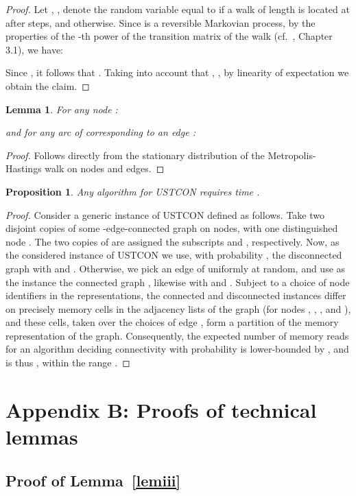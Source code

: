 \documentclass[11pt,a4paper]{article}
\newtheorem{proposition}{Proposition}
\newtheorem{lemma}{Lemma}
\renewcommand{\*}{\hspace*{5mm}}
\begin{document}
\begin{proof}
Let , , denote the random variable equal to  if a walk of length  is located at  after  steps, and  otherwise. Since  is a reversible Markovian process, by the properties of the -th power of the transition matrix of the walk (cf.~\cite{AF}, Chapter 3.1), we have:

Since , it follows that . Taking into account that , , by linearity of expectation we obtain the claim.
\end{proof}


\begin{lemma}\label{lembla}
For any node :

and for any arc  of  corresponding to an edge :

\end{lemma}
\begin{proof}
Follows directly from the stationary distribution of the Metropolis-Hastings walk on nodes and edges.
\end{proof}

\begin{proposition}\label{lbm}
Any algorithm for USTCON requires time .
\end{proposition}
\begin{proof}
Consider a generic instance of USTCON defined as follows. Take two disjoint copies of some -edge-connected graph  on  nodes, with one distinguished node . The two copies of  are assigned the subscripts  and , respectively. Now, as the considered instance of USTCON we use, with probability , the disconnected graph  with  and . Otherwise, we pick an edge  of  uniformly at random, and use as the instance the connected graph , likewise with  and . Subject to a choice of node identifiers in the representations, the connected and disconnected instances differ on precisely  memory cells in the adjacency lists of the graph (for nodes , , , and ), and these cells, taken over the choices of edge , form a partition of the memory representation of the graph. Consequently, the expected number of memory reads for an algorithm deciding connectivity with probability  is lower-bounded by , and is thus , within the range .
\end{proof}


\section*{Appendix B: Proofs of technical lemmas}


\subsection*{Proof of Lemma~\ref{lemiii}}
\end{document}
